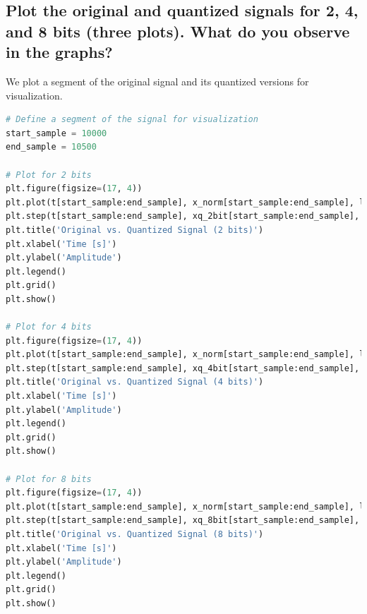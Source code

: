 \documentclass[10pt]{article}
\theoremstyle{definition}
\theoremstyle{remark}
\theoremstyle{definition}
\numberwithin{equation}{prob}
\begin{document}
\subsection{Plot the original and quantized signals for 2, 4, and 8 bits (three plots). What do you observe in the graphs?}

We plot a segment of the original signal and its quantized versions for visualization.

\begin{lstlisting}[language=Python]
# Define a segment of the signal for visualization
start_sample = 10000
end_sample = 10500

# Plot for 2 bits
plt.figure(figsize=(17, 4))
plt.plot(t[start_sample:end_sample], x_norm[start_sample:end_sample], label='Original')
plt.step(t[start_sample:end_sample], xq_2bit[start_sample:end_sample], label='Quantized (2 bits)', where='mid', alpha=0.7)
plt.title('Original vs. Quantized Signal (2 bits)')
plt.xlabel('Time [s]')
plt.ylabel('Amplitude')
plt.legend()
plt.grid()
plt.show()

# Plot for 4 bits
plt.figure(figsize=(17, 4))
plt.plot(t[start_sample:end_sample], x_norm[start_sample:end_sample], label='Original')
plt.step(t[start_sample:end_sample], xq_4bit[start_sample:end_sample], label='Quantized (4 bits)', where='mid', alpha=0.7)
plt.title('Original vs. Quantized Signal (4 bits)')
plt.xlabel('Time [s]')
plt.ylabel('Amplitude')
plt.legend()
plt.grid()
plt.show()

# Plot for 8 bits
plt.figure(figsize=(17, 4))
plt.plot(t[start_sample:end_sample], x_norm[start_sample:end_sample], label='Original')
plt.step(t[start_sample:end_sample], xq_8bit[start_sample:end_sample], label='Quantized (8 bits)', where='mid', alpha=0.7)
plt.title('Original vs. Quantized Signal (8 bits)')
plt.xlabel('Time [s]')
plt.ylabel('Amplitude')
plt.legend()
plt.grid()
plt.show()
\end{lstlisting}
\end{document}
